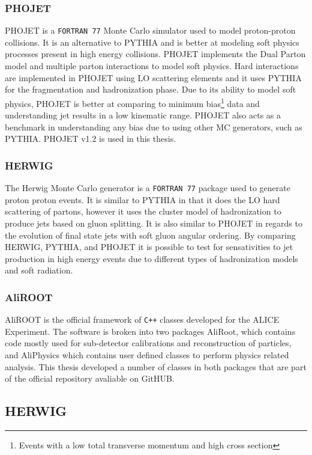 \subsubsection{PHOJET}
PHOJET is a \verb|FORTRAN 77| Monte Carlo simulator used to model proton-proton collisions. It is an alternative to PYTHIA and is better at modeling soft physics processes present in high energy collisions.   PHOJET implements the Dual Parton model\cite{CAPELLA1994225}\cite{Wong:241251} and multiple parton interactions\cite{Bopp:1998rc} to model soft physics.  Hard interactions are implemented in PHOJET using LO scattering elements and it uses PYTHIA for the fragmentation and hadronization phase.  Due to its ability to model soft physics, PHOJET is better at comparing to minimum bias\footnote{Events with a low total transverse momentum and high cross section} data and understanding jet results in a low kinematic range.  PHOJET also acts as a benchmark in understanding any bias due to using other MC generators, such as PYTHIA.  PHOJET v1.2 is used in this thesis.


\subsubsection{HERWIG}
The Herwig\cite{Bahr:2008pv} Monte Carlo generator is a \verb|FORTRAN 77| package used to generate proton proton events.  It is similar to PYTHIA in that it does the LO hard scattering of partons, however it uses the cluster model of hadronization to produce jets based on gluon splitting.  It is also similar to PHOJET in regards to the evolution of final state jets with soft gluon angular ordering.  By comparing HERWIG, PYTHIA, and PHOJET it is possible to test for sensativities to jet production in high energy events due to different types of hadronization models and soft radiation.

\subsubsection{AliROOT}
AliROOT is the official framework of \verb|C++| classes developed for the ALICE Experiment.  The software is broken into two packages AliRoot, which contains code mostly used for sub-detector calibrations and reconstruction of particles, and AliPhysics which contains user defined classes to perform physics related analysis.  This thesis developed a number of classes in both packages that are part of the official repository avaliable on GitHUB.

\iffalse
\subsection{HERWIG}

